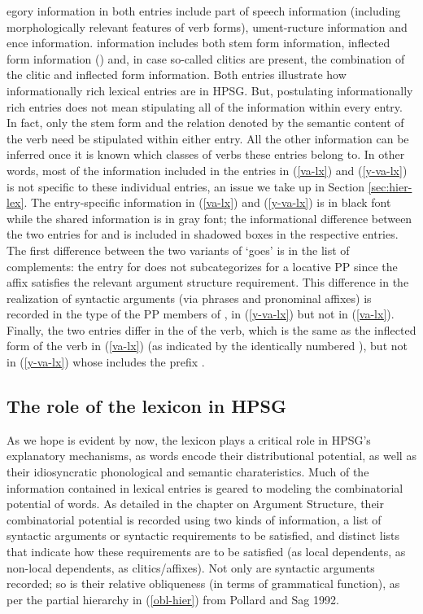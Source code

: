 \documentclass[output=paper]{langsci/langscibook}
\begin{document}
egory information in both entries include part of speech information (including morphologically relevant features of verb forms), ument-ructure information and ence information.  information includes both stem form information, inflected form information () and, in case so-called clitics are present, the combination of the clitic and inflected form information. Both entries illustrate how informationally rich lexical entries are in HPSG. But, postulating informationally rich entries does not mean stipulating all of the information within every entry. In fact, only the stem form and the relation denoted by the semantic content of the verb  need be stipulated within either entry. All the other information can be inferred once it is known which classes of verbs these entries belong to. In other words, most of the information included in the entries in (\ref{va-lx}) and (\ref{y-va-lx}) is not specific to these individual entries, an issue we take up in Section \ref{sec:hier-lex}.  The entry-specific information in (\ref{va-lx}) and (\ref{y-va-lx}) is in black font while the shared information is in gray font; the informational difference between the two entries for  and  is included in shadowed boxes in the respective entries. The first difference between the two variants of  `goes' is in the list of complements: the entry for  does not subcategorizes for a locative PP since the affix  satisfies the relevant argument structure requirement. This difference in the realization of syntactic arguments (via phrases and pronominal affixes) is recorded in the type of the PP members of ,  in (\ref{y-va-lx}) but not in (\ref{va-lx}). Finally, the two entries differ in the  of the verb, which is the same as the inflected form of the verb in (\ref{va-lx}) (as indicated by the identically numbered ), but not in (\ref{y-va-lx}) whose  includes the prefix .  

\subsection{The role of the lexicon in HPSG}

As we hope is evident by now, the lexicon plays a critical role in HPSG's explanatory mechanisms, as words encode their distributional potential, as well as their idiosyncratic phonological and semantic charateristics. 
Much of the information contained in lexical entries is geared to modeling the combinatorial potential of words. As detailed in the chapter on Argument Structure, their combinatorial potential is recorded using two kinds of information, 
a list of syntactic arguments or syntactic requirements to be satisfied, and distinct lists that indicate how these requirements are to be satisfied (as local dependents, as non-local dependents, as clitics/affixes).
Not only are syntactic arguments recorded; so is their relative obliqueness (in terms of grammatical function), as per the partial hierarchy in (\ref{obl-hier}) from Pollard and Sag 1992. 
\end{document}
